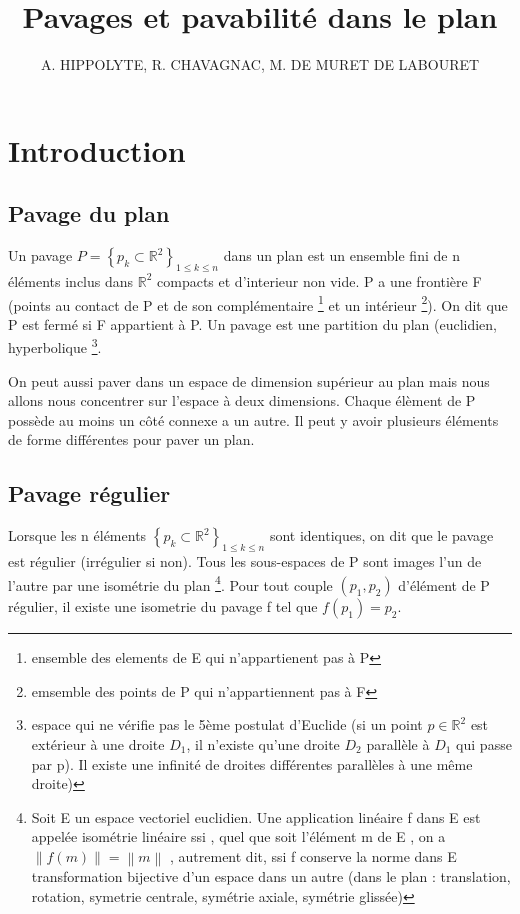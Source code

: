\documentclass{article}
\title{Pavages et pavabilité dans le plan}
\author{A. HIPPOLYTE, R. CHAVAGNAC, M. DE MURET DE LABOURET}
\begin{document}
\maketitle

\tableofcontents

\newpage

\section{Introduction}

\subsection{Pavage du plan}

Un pavage $P=\left \{ p_{k}\subset \mathbb{R}^{2} \right \}_{1\leq k\leq n}$ dans un plan est un ensemble fini de n éléments inclus dans $\mathbb{R}^{2}$ compacts et d’interieur non vide.
P a une frontière F (points au contact de P et de son complémentaire \footnote{ensemble des elements de E qui n'appartienent pas à P} et un intérieur \footnote{emsemble des points de P qui n'appartiennent pas à F}).
On dit que P est fermé si F appartient à P.
Un pavage est une partition du plan (euclidien, hyperbolique \footnote{ espace qui ne vérifie pas le 5ème postulat d’Euclide (si un point $p\in \mathbb{R}^{2}$ est extérieur à une droite $D_{1}$, il n’existe qu’une droite $D_{2}$ parallèle à $D_{1}$ qui passe par p). Il existe une infinité de droites différentes parallèles à une même droite)}.

On peut aussi paver dans un espace de dimension supérieur au plan mais nous allons nous concentrer sur l’espace à deux dimensions.
Chaque élèment de P possède au moins un côté connexe a un autre.
Il peut y avoir plusieurs éléments de forme différentes pour paver un plan.

\subsection{Pavage régulier}

Lorsque les n éléments $\left \{ p_{k}\subset \mathbb{R}^{2} \right \}_{1\leq k\leq n}$ sont identiques, on dit que le pavage est régulier (irrégulier si non).
Tous les sous-espaces de P sont images l’un de l’autre par une isométrie du plan \footnote{ Soit E un espace vectoriel euclidien. Une application linéaire f dans E est appelée isométrie linéaire ssi , quel que soit l’élément m de E , on a $\left \| f\left ( m \right ) \right \| = \left \| m \right \|$ , autrement dit, ssi f conserve la norme dans E transformation bijective d'un espace dans un autre (dans le plan : translation, rotation, symetrie centrale, symétrie axiale, symétrie glissée)}.
Pour tout couple $\left ( p_{1} ,p_{2}\right )$ d'élément de P régulier, il existe une isometrie du pavage f tel que $f\left (  p_{1}\right )=p_{2}$.
\end{document}
